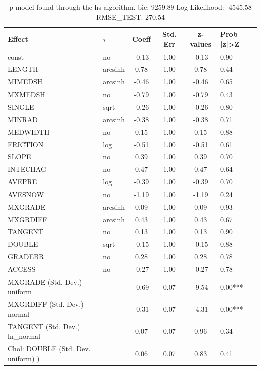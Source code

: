 \begin{table}
	\caption{p model found through the hs algorithm. bic: 9259.89 Log-Likelihood: -4545.58 RMSE_TEST: 270.54}
	\begin{center}
		\begin{tabular}{|l|l|c|c|c|l|}
			\hline
			Effect & $\tau$ & Coeff & Std. Err & z-values & Prob |z|>Z \\
			\hline
			const & no & -0.13 & 1.00 & -0.13 & 0.90 \\
			\hline
			LENGTH & arcsinh & 0.78 & 1.00 & 0.78 & 0.44 \\
			\hline
			MIMEDSH & arcsinh & -0.46 & 1.00 & -0.46 & 0.65 \\
			\hline
			MXMEDSH & no & -0.79 & 1.00 & -0.79 & 0.43 \\
			\hline
			SINGLE & sqrt & -0.26 & 1.00 & -0.26 & 0.80 \\
			\hline
			MINRAD & arcsinh & -0.38 & 1.00 & -0.38 & 0.71 \\
			\hline
			MEDWIDTH & no & 0.15 & 1.00 & 0.15 & 0.88 \\
			\hline
			FRICTION & log & -0.51 & 1.00 & -0.51 & 0.61 \\
			\hline
			SLOPE & no & 0.39 & 1.00 & 0.39 & 0.70 \\
			\hline
			INTECHAG & no & 0.47 & 1.00 & 0.47 & 0.64 \\
			\hline
			AVEPRE & log & -0.39 & 1.00 & -0.39 & 0.70 \\
			\hline
			AVESNOW & no & -1.19 & 1.00 & -1.19 & 0.24 \\
			\hline
			MXGRADE & arcsinh & 0.09 & 1.00 & 0.09 & 0.93 \\
			\hline
			MXGRDIFF & arcsinh & 0.43 & 1.00 & 0.43 & 0.67 \\
			\hline
			TANGENT & no & 0.13 & 1.00 & 0.13 & 0.90 \\
			\hline
			DOUBLE & sqrt & -0.15 & 1.00 & -0.15 & 0.88 \\
			\hline
			GRADEBR & no & 0.28 & 1.00 & 0.28 & 0.78 \\
			\hline
			ACCESS & no & -0.27 & 1.00 & -0.27 & 0.78 \\
			\hline
			MXGRADE (Std. Dev.) uniform &  & -0.69 & 0.07 & -9.54 & 0.00*** \\
			\hline
			MXGRDIFF (Std. Dev.) normal &  & -0.31 & 0.07 & -4.31 & 0.00*** \\
			\hline
			TANGENT (Std. Dev.) ln_normal &  & 0.07 & 0.07 & 0.96 & 0.34 \\
			\hline
			 Chol: DOUBLE (Std. Dev. uniform) ) &  & 0.06 & 0.07 & 0.83 & 0.41 \\

\end{tabular}
\end{center}
\end{table}
